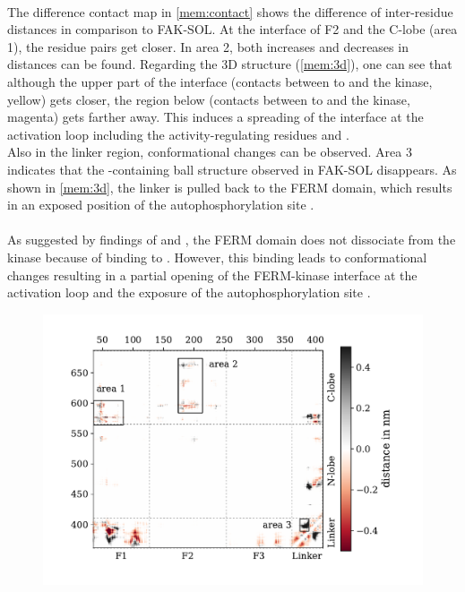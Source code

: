 %
%
%
\\
The difference contact map in \autoref{mem:contact} shows the difference of inter-residue distances in comparison to FAK-SOL. At the interface of F2 and the C-lobe (area 1), the residue pairs get closer. In area 2, both increases and decreases in distances can be found. Regarding the 3D structure (\autoref{mem:3d}), one can see that although the upper part of the interface (contacts between  to  and the kinase, yellow) gets closer, the region below (contacts between  to  and the kinase, magenta) gets farther away. This induces a spreading of the interface at the activation loop including the activity-regulating residues  and .\\
Also in the linker region, conformational changes can be observed. Area 3 indicates that the -containing ball structure observed in FAK-SOL disappears. As shown in \autoref{mem:3d}, the linker is pulled back to the FERM domain, which results in an exposed position of the autophosphorylation site .\\
\\
As suggested by findings of \textcite{pap001} and \textcite{pap003}, the FERM domain does not dissociate from the kinase because of binding to \pip{}. However, this binding leads to conformational changes resulting in a partial opening of the FERM-kinase interface at the activation loop and the exposure of the autophosphorylation site .
%
%
%
\begin{figure}[th]
	\centering
	\includegraphics[width=.8\textwidth]{figures/results/contactmap_diff_to_free}
	\label{mem:contact}
\end{figure}
